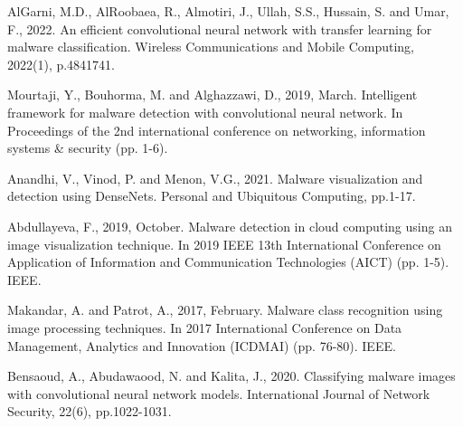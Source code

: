\documentclass[conference]{IEEEtran}
\begin{document}
\begin{thebibliography}{00}
 AlGarni, M.D., AlRoobaea, R., Almotiri, J., Ullah, S.S., Hussain, S. and Umar, F., 2022. An efficient convolutional neural network with transfer learning for malware classification. Wireless Communications and Mobile Computing, 2022(1), p.4841741.

 Mourtaji, Y., Bouhorma, M. and Alghazzawi, D., 2019, March. Intelligent framework for malware detection with convolutional neural network. In Proceedings of the 2nd international conference on networking, information systems \& security (pp. 1-6).

 Anandhi, V., Vinod, P. and Menon, V.G., 2021. Malware visualization and detection using DenseNets. Personal and Ubiquitous Computing, pp.1-17.

 Abdullayeva, F., 2019, October. Malware detection in cloud computing using an image visualization technique. In 2019 IEEE 13th International Conference on Application of Information and Communication Technologies (AICT) (pp. 1-5). IEEE.

 Makandar, A. and Patrot, A., 2017, February. Malware class recognition using image processing techniques. In 2017 International Conference on Data Management, Analytics and Innovation (ICDMAI) (pp. 76-80). IEEE.

 Bensaoud, A., Abudawaood, N. and Kalita, J., 2020. Classifying malware images with convolutional neural network models. International Journal of Network Security, 22(6), pp.1022-1031.

\end{thebibliography}
\vspace{12pt}
\end{document}
